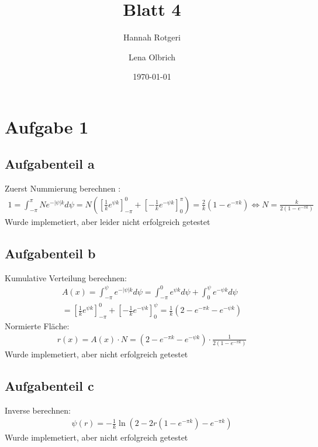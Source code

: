 \documentclass[11pt,a4paper]{article}
\title{Blatt 4}
\date{\today}
\author{Hannah Rotgeri \and Lena Olbrich}
\begin{document}
    \maketitle

    \section*{Aufgabe 1}
\subsection*{Aufgabenteil a}
Zuerst Nummierung berechnen :
\begin{align*}
1= \int_{-\pi}^{\pi} N e^{-|\psi| k} d\psi= N \left( [\frac{1}{k}e^{\psi k}]^0_{-\pi} + [-\frac{1}{k}e^{-\psi k}]^\pi_{0}\right)=\frac{2}{k}(1-e^{-\pi k}) \Leftrightarrow N=\frac{k}{2(1-e^{-\pi k})}
\end{align*}
Wurde implemetiert, aber leider nicht erfolgreich getestet

\subsection*{Aufgabenteil b}
Kumulative Verteilung berechnen:
\begin{align*}
A(x)=\int_{-\pi}^{\psi}e^{-|\psi|k}d\psi=
\int_{-\pi}^{0} e^{\psi k} d \psi + \int_{0}^{\psi} e^{-\psi k} d \psi \\
= \left[\frac{1}{k} e^{\psi k}\right]^0_{-\pi} +\left[-\frac{1}{k}e^{-\psi k}\right]^\psi_0
=\frac{1}{k}\left(2- e^{-\pi k} - e^{-\psi k} \right)
\end{align*}
Normierte Fläche:
\begin{align*}
r(x)= A(x)\cdot N = \left(2- e^{-\pi k} - e^{-\psi k} \right) \cdot \frac{1}{2(1-e^{-\pi k})}
\end{align*}
Wurde implemetiert, aber nicht erfolgreich getestet
\subsection*{Aufgabenteil c}
Inverse berechnen:
\begin{align*}
 \psi(r)=-\frac{1}{k}\ln(2-2r(1-e^{-\pi k})-e^{-\pi k})
\end{align*}
Wurde implemetiert, aber nicht erfolgreich getestet
\end{document}
